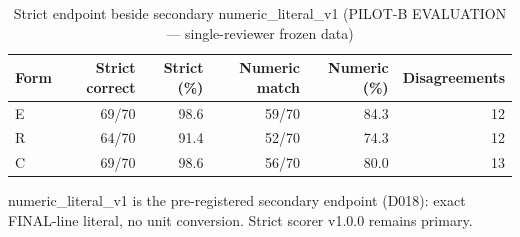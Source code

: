 \begin{table}[t]
\centering
\small
\caption{Strict endpoint beside secondary numeric\_literal\_v1 (PILOT-B EVALUATION --- single-reviewer frozen data)}
\label{tab:pilotb-Qwen3-8B-numeric}
\begin{tabular}{lrrrrr}
\toprule
Form & Strict correct & Strict (\%) & Numeric match & Numeric (\%) & Disagreements \\
\midrule
E & 69/70 & 98.6 & 59/70 & 84.3 & 12 \\
R & 64/70 & 91.4 & 52/70 & 74.3 & 12 \\
C & 69/70 & 98.6 & 56/70 & 80.0 & 13 \\
\bottomrule
\end{tabular}
\par\smallskip
\parbox{\linewidth}{\footnotesize numeric\_literal\_v1 is the pre-registered secondary endpoint (D018): exact FINAL-line literal, no unit conversion. Strict scorer v1.0.0 remains primary.}
\end{table}
